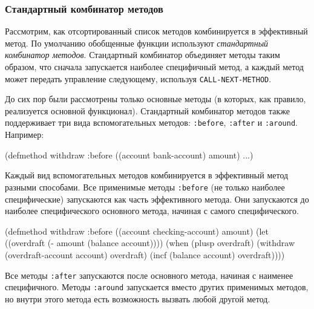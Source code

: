 \subsubsection{Стандартный комбинатор методов}
Рассмотрим, как отсортированный список методов комбинируется в эффективный метод. По умолчанию обобщенные функции используют \emph{стандартный комбинатор методов}. Стандартный комбинатор объединяет методы таким образом, что сначала запускается наиболее специфичный метод, а каждый метод может передать управление следующему, используя \lstinline{CALL-NEXT-METHOD}.

До сих пор были рассмотрены только основные методы (в которых, как правило, реализуется основной функционал). Стандартный комбинатор методов также поддерживает три вида вспомогательных методов: \lstinline{:before}, \lstinline{:after} и \lstinline{:around}. Например:
\begin{cllst}{}{}
(defmethod withdraw :before ((account bank-account) amount) ...)
\end{cllst}

Каждый вид вспомогательных методов комбинируется в эффективный метод разными способами. Все применимые методы \lstinline{:before} (не только наиболее специфические) запускаются как часть эффективного метода. Они запускаются до наиболее специфического основного метода, начиная с самого специфического.
\begin{cllst}{}{}
(defmethod withdraw :before ((account checking-account) amount)
  (let ((overdraft (- amount (balance account))))
    (when (plusp overdraft)
      (withdraw (overdraft-account account) overdraft)
      (incf (balance account) overdraft))))
\end{cllst}

Все методы \lstinline{:after} запускаются после основного метода, начиная с наименее специфичного. Методы \lstinline{:around} запускается вместо других применимых методов, но внутри этого метода есть возможность вызвать любой другой метод.


